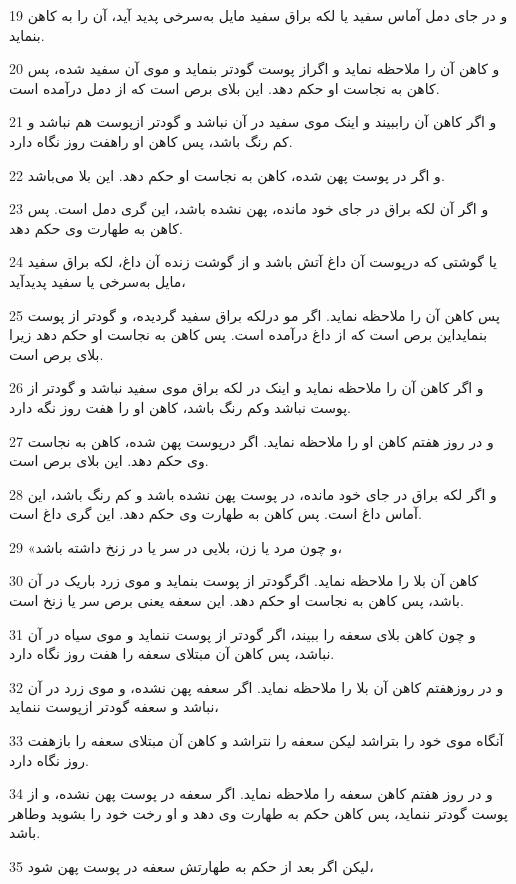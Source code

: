 \par 19 و در جای دمل آماس سفید یا لکه براق سفید مایل به‌سرخی پدید آید، آن را به کاهن بنماید.
\par 20 و کاهن آن را ملاحظه نماید و اگراز پوست گودتر بنماید و موی آن سفید شده، پس کاهن به نجاست او حکم دهد. این بلای برص است که از دمل درآمده است.
\par 21 و اگر کاهن آن راببیند و اینک موی سفید در آن نباشد و گودتر ازپوست هم نباشد و کم رنگ باشد، پس کاهن او راهفت روز نگاه دارد.
\par 22 و اگر در پوست پهن شده، کاهن به نجاست او حکم دهد. این بلا می‌باشد.
\par 23 و اگر آن لکه براق در جای خود مانده، پهن نشده باشد، این گری دمل است. پس کاهن به طهارت وی حکم دهد.
\par 24 یا گوشتی که درپوست آن داغ آتش باشد و از گوشت زنده آن داغ، لکه براق سفید مایل به‌سرخی یا سفید پدیدآید،
\par 25 پس کاهن آن را ملاحظه نماید. اگر مو درلکه براق سفید گردیده، و گودتر از پوست بنمایداین برص است که از داغ درآمده است. پس کاهن به نجاست او حکم دهد زیرا بلای برص است.
\par 26 و اگر کاهن آن را ملاحظه نماید و اینک در لکه براق موی سفید نباشد و گودتر از پوست نباشد وکم رنگ باشد، کاهن او را هفت روز نگه دارد.
\par 27 و در روز هفتم کاهن او را ملاحظه نماید. اگر درپوست پهن شده، کاهن به نجاست وی حکم دهد. این بلای برص است.
\par 28 و اگر لکه براق در جای خود مانده، در پوست پهن نشده باشد و کم رنگ باشد، این آماس داغ است. پس کاهن به طهارت وی حکم دهد. این گری داغ است.
\par 29 «و چون مرد یا زن، بلایی در سر یا در زنخ داشته باشد،
\par 30 کاهن آن بلا را ملاحظه نماید. اگرگودتر از پوست بنماید و موی زرد باریک در آن باشد، پس کاهن به نجاست او حکم دهد. این سعفه یعنی برص سر یا زنخ است.
\par 31 و چون کاهن بلای سعفه را ببیند، اگر گودتر از پوست ننماید و موی سیاه در آن نباشد، پس کاهن آن مبتلای سعفه را هفت روز نگاه دارد.
\par 32 و در روزهفتم کاهن آن بلا را ملاحظه نماید. اگر سعفه پهن نشده، و موی زرد در آن نباشد و سعفه گودتر ازپوست ننماید،
\par 33 آنگاه موی خود را بتراشد لیکن سعفه را نتراشد و کاهن آن مبتلای سعفه را بازهفت روز نگاه دارد.
\par 34 و در روز هفتم کاهن سعفه را ملاحظه نماید. اگر سعفه در پوست پهن نشده، و از پوست گودتر ننماید، پس کاهن حکم به طهارت وی دهد و او رخت خود را بشوید وطاهر باشد.
\par 35 لیکن اگر بعد از حکم به طهارتش سعفه در پوست پهن شود،

